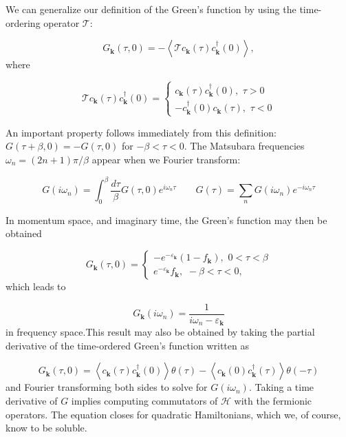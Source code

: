 We can generalize our definition of the Green's function by using the time-ordering operator $\mathcal{T}$:

\begin{equation}
G_{\bm k}(\tau, 0) = - \left\langle \mathcal{T} c_{\bm k} ( \tau) c_{\bm k}^\dagger ( 0 ) \right\rangle ,
\end{equation}
where

\begin{equation}
\mathcal{T} c_{\bm k} ( \tau) c_{\bm k}^\dagger ( 0 ) =
\begin{cases}
c_{\bm k} ( \tau) c_{\bm k}^\dagger ( 0 ), \,\, \tau > 0 \\
- c_{\bm k}^\dagger ( 0 ) c_{\bm k} ( \tau) , \,\, \tau < 0
\end{cases}
\end{equation}

An important property follows immediately from this definition: $G ( \tau + \beta, 0 ) = - G( \tau, 0 )$ for $ -\beta < \tau < 0$.
The Matsubara frequencies $\omega_n = (2n + 1) \pi / \beta$ appear when we Fourier transform:

\begin{equation}
G ( i \omega_n ) = \int_0^\beta \frac{d\tau}{\beta} G( \tau, 0) e^{i\omega_n \tau} \quad\quad G (\tau) = \sum_n G ( i \omega_n ) e^{ - i \omega_n \tau}
\end{equation}

In momentum space, and imaginary time, the Green's function may then be obtained

\begin{equation}
G_{\bm k} (\tau, 0 ) =
\begin{cases}
-e^{-\varepsilon_{\bm k}} ( 1 - f_{\bm k} ) , \,\, 0 < \tau < \beta \\
e^{-\varepsilon_{\bm k}} f_{\bm k} , \,\, -\beta < \tau < 0 ,
\end{cases}
\end{equation}
which leads to

\begin{equation}
G_{\bm k} ( i \omega_n ) = \frac{1}{i\omega_n - \varepsilon_{\bm k} }
\end{equation}
in frequency space.This result may also be obtained by taking the partial derivative of the time-ordered Green's function written as

\begin{equation}
G_{\bm k} ( \tau, 0 ) = \left\langle c_{\bm k} ( \tau) c_{\bm k}^\dagger ( 0 ) \right\rangle \theta ( \tau ) - \left\langle c_{\bm k} ( 0 ) c_{\bm k}^\dagger ( \tau ) \right\rangle \theta ( -\tau )
\end{equation}
and Fourier transforming both sides to solve for $G ( i \omega_n )$.
Taking a time derivative of $G$ implies computing commutators of $\mathcal{H}$ with the fermionic operators.
The equation closes for quadratic Hamiltonians, which we, of course, know to be soluble.

